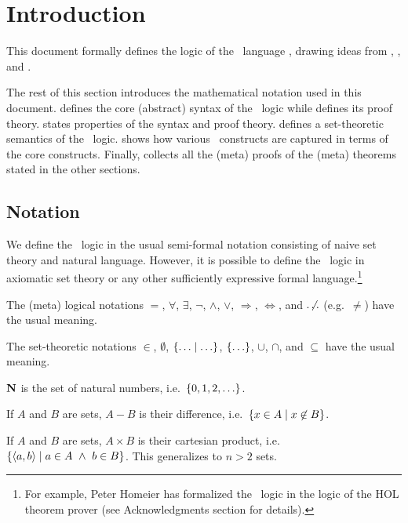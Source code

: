 \section{Introduction}

This document formally defines the logic of the \MS\ language
\cite{lm}, drawing ideas from \cite{andrews}, \cite{pvs-seman}, and
\cite[Part II]{hol}.

The rest of this section introduces the mathematical notation used in this
document.  defines the core (abstract) syntax of the \MS\ logic
while  defines its proof theory.  states
properties of the syntax and proof theory.  defines a
set-theoretic semantics of the \MS\ logic.  shows how various
\MS\ constructs are captured in terms of the core constructs. Finally,
 collects all the (meta) proofs of the (meta) theorems stated
in the other sections.

\subsection{Notation}

We define the \MS\ logic in the usual semi-formal notation consisting of naive
set theory and natural language. However, it is possible to define the \MS\
logic in axiomatic set theory or any other sufficiently expressive formal
language.\footnote{For example, Peter Homeier has formalized the \MS\ logic in
the logic of the HOL theorem prover (see Acknowledgments section for
details).}

The (meta) logical notations $=$, $\forall$, $\exists$, $\neg$, $\wedge$,
$\vee$, $\Rightarrow$, $\Leftrightarrow$, and $\ \not\!\!\!\!\ldots$ (e.g.\
$\neq$) have the usual meaning.

The set-theoretic notations $\in$, $\emptyset$, $\{\ldots\mid\ldots\}$,
$\{\ldots\}$, $\cup$, $\cap$, and $\subseteq$ have the usual meaning.

$\mathbf{N}$ is the set of natural numbers, i.e.\ $\{0,1,2,\ldots\}$.


If $A$ and $B$ are sets, $A-B$ is their difference, i.e.\ $\{x\in
A\mid x\not\in B\}$.

If $A$ and $B$ are sets, $A\times B$ is their cartesian product, i.e.\
$\{\langle a,b\rangle\mid a\in A\ \wedge\  b\in B\}$. This generalizes to $n>2$ sets.

